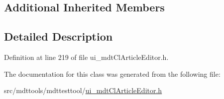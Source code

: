\subsection*{Additional Inherited Members}


\subsection{Detailed Description}


Definition at line 219 of file ui\-\_\-mdt\-Cl\-Article\-Editor.\-h.



The documentation for this class was generated from the following file\-:\begin{DoxyCompactItemize}
\item 
src/mdttools/mdttesttool/\hyperlink{ui__mdt_cl_article_editor_8h}{ui\-\_\-mdt\-Cl\-Article\-Editor.\-h}\end{DoxyCompactItemize}
